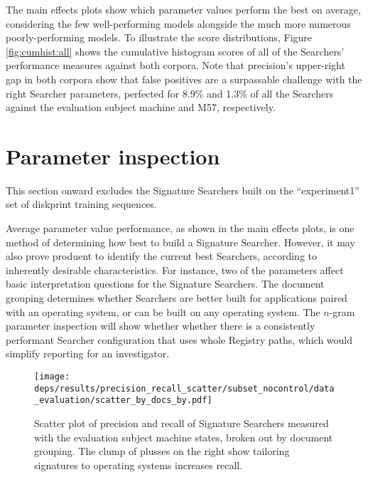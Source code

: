 \documentclass[11pt]{ucthesis}
\theoremstyle{plain}
\theoremstyle{definition}
\begin{document}
The main effects plots show which parameter values perform the best on average, considering the few well-performing models alongside the much more numerous poorly-performing models.  To illustrate the score distributions, Figure \ref{fig:cumhist:all} shows the cumulative histogram scores of all of the Searchers' performance measures against both corpora.  Note that precision's upper-right gap in both corpora show that false positives are a surpassable challenge with the right Searcher parameters, perfected for 8.9\% and 1.3\% of all the Searchers against the evaluation subject machine and M57, respectively.


\section{Parameter inspection}

This section onward excludes the Signature Searchers built on the ``experiment1'' set of diskprint training sequences.

Average parameter value performance, as shown in the main effects plots, is one method of determining how best to build a Signature Searcher.  However, it may also prove produent to identify the current best Searchers, according to inherently desirable characteristics.  For instance, two of the parameters affect basic interpretation questions for the Signature Searchers.  The document grouping determines whether Searchers are better built for applications paired with an operating system, or can be built on any operating system.  The $n$-gram parameter inspection will show whether whether there is a consistently performant Searcher configuration that uses whole Registry paths, which would simplify reporting for an investigator.

\begin{figure}
  \centering
  \texttt{[image: deps/results/precision\_recall\_scatter/subset\_nocontrol/data\_evaluation/scatter\_by\_docs\_by.pdf]}
  \caption{Scatter plot of precision and recall of Signature Searchers measured with the evaluation subject machine states, broken out by document grouping.  The clump of plusses on the right show tailoring signatures to operating systems increases recall.}
  \label{fig:spbo:docsby}
\end{figure}
\end{document}
